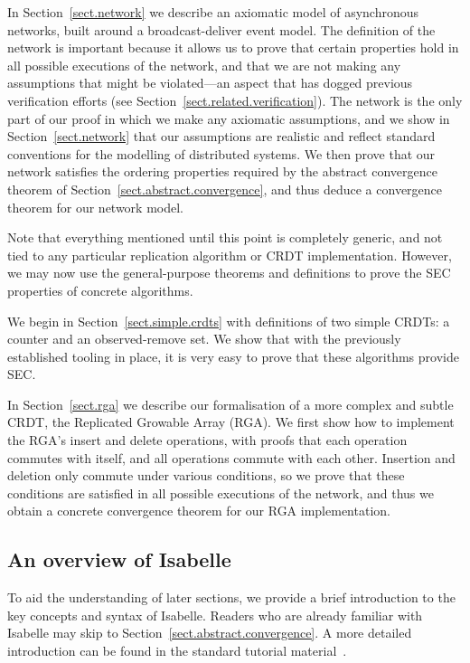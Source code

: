 In Section~\ref{sect.network} we describe an axiomatic model of asynchronous networks, built around a broadcast-deliver event model.
The definition of the network is important because it allows us to prove that certain properties hold in all possible executions of the network, and that we are not making any assumptions that might be violated---an aspect that has dogged previous verification efforts (see Section~\ref{sect.related.verification}).
The network is the only part of our proof in which we make any axiomatic assumptions, and we show in Section~\ref{sect.network} that our assumptions are realistic and reflect standard conventions for the modelling of distributed systems.
We then prove that our network satisfies the ordering properties required by the abstract convergence theorem of Section~\ref{sect.abstract.convergence}, and thus deduce a convergence theorem for our network model.

Note that everything mentioned until this point is completely generic, and not tied to any particular replication algorithm or CRDT implementation.
However, we may now use the general-purpose theorems and definitions to prove the SEC properties of concrete algorithms.

We begin in Section~\ref{sect.simple.crdts} with definitions of two simple CRDTs: a counter and an observed-remove set.
We show that with the previously established tooling in place, it is very easy to prove that these algorithms provide SEC.

In Section~\ref{sect.rga} we describe our formalisation of a more complex and subtle CRDT, the Replicated Growable Array (RGA).
We first show how to implement the RGA's insert and delete operations, with proofs that each operation commutes with itself, and all operations commute with each other.
Insertion and deletion only commute under various conditions, so we prove that these conditions are satisfied in all possible executions of the network, and thus we obtain a concrete convergence theorem for our RGA implementation.

\subsection{An overview of Isabelle}
\label{subsect.an.overview.of.isabelle}

To aid the understanding of later sections, we provide a brief introduction to the key concepts and syntax of Isabelle.
Readers who are already familiar with Isabelle may skip to Section~\ref{sect.abstract.convergence}.
A more detailed introduction can be found in the standard tutorial material~\cite{DBLP:books/sp/NipkowK14}.

